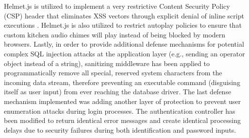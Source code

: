 Helmet.js is utilized to implement a very restrictive Content Security Policy (CSP) header that eliminates XSS vectors through explicit denial of inline script executions \cite{google2016csp}. Helmet.js is also utilized to restrict autoplay policies to ensure that custom kitchen audio chimes will play instead of being blocked by modern browsers. Lastly, in order to provide additional defense mechanisms for potential complex SQL injection attacks at the application layer (e.g., sending an operator object instead of a string), sanitizing middleware has been applied to programmatically remove all special, reserved system characters from the incoming data stream, therefore preventing an executable command (disguising itself as user input) from ever reaching the database driver. The last defense mechanism implemented was adding another layer of protection to prevent user enumeration attacks during login processes. The authentication controller has been modified to return identical error messages and create identical processing delays due to security failures during both identification and password inputs.
